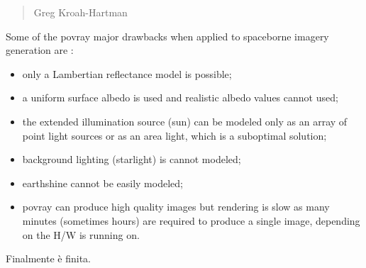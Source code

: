 \begin{quotation}
{\footnotesize
{}
\begin{flushright}
Greg Kroah-Hartman
\end{flushright}
}
\end{quotation}
\vspace{0.5cm}

 Some of the \acrshort{povray} major drawbacks when applied to spaceborne imagery generation are \cite{pangufinal}:

\begin{itemize}
  \item only a Lambertian reflectance model is possible;
  \item a uniform surface albedo is used and realistic albedo values cannot used;
  \item the extended illumination source (sun) can be modeled only as an array of point light sources or as an area light, which is a suboptimal solution;
  \item background lighting (starlight) is cannot modeled;
  \item earthshine cannot be easily modeled;
  \item \acrshort{povray} can produce high quality images but rendering is slow as many minutes (sometimes hours) are required to produce a single image, depending on the H/W is running on.
\end{itemize}

Finalmente è finita.
